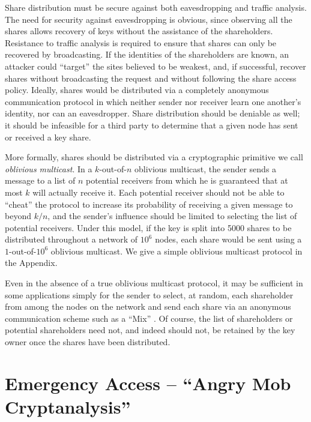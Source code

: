 Share distribution must be secure against both eavesdropping and
traffic analysis.  The need for security against eavesdropping is
obvious, since observing all the shares allows recovery of keys
without the assistance of the shareholders.  Resistance to traffic
analysis is required to ensure that shares can only be recovered by
broadcasting.  If the identities of the shareholders are known, an
attacker could ``target'' the sites believed to be weakest, and, if
successful, recover shares without broadcasting the request and
without following the share access policy.  Ideally, shares would be
distributed via a completely anonymous communication protocol in which
neither sender nor receiver learn one another's identity, nor can an
eavesdropper.  Share distribution should be deniable as well; it
should be infeasible for a third party to determine that a given node
has sent or received a key share.

More formally, shares should be distributed via a cryptographic
primitive we call {\em oblivious multicast}.  In a $k$-out-of-$n$
oblivious multicast, the sender sends a message to a list of $n$
potential receivers from which he is guaranteed that at most $k$ will
actually receive it.  Each potential receiver should not be able to
``cheat'' the protocol to increase its probability of receiving a
given message to beyond $k/n$, and the sender's influence should be
limited to selecting the list of potential receivers.  Under this
model, if the key is split into 5000 shares to be distributed
throughout a network of $10^6$ nodes, each share would be sent using a
$1$-out-of-$10^6$ oblivious multicast.  We give a simple oblivious
multicast protocol in the Appendix.

Even in the absence of a true oblivious multicast protocol, it may be
sufficient in some applications simply for the sender to select, at
random, each shareholder from among the nodes on the network and send
each share via an anonymous communication scheme such as a ``Mix''
\cite{mix}.  Of course, the list of shareholders or potential
shareholders need not, and indeed should not, be retained by the key
owner once the shares have been distributed.

\section{Emergency Access -- ``Angry Mob Cryptanalysis''}

